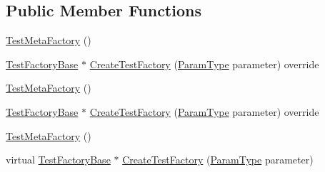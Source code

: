 \subsection*{Public Member Functions}
\begin{DoxyCompactItemize}
\item 
\mbox{\hyperlink{classtesting_1_1internal_1_1_test_meta_factory_a1a48d63fbff650741c8f718af5c373d2}{Test\+Meta\+Factory}} ()
\item 
\mbox{\hyperlink{classtesting_1_1internal_1_1_test_factory_base}{Test\+Factory\+Base}} $\ast$ \mbox{\hyperlink{classtesting_1_1internal_1_1_test_meta_factory_abd5d30fab71229deb5e63f5bb5ea3fd8}{Create\+Test\+Factory}} (\mbox{\hyperlink{classtesting_1_1internal_1_1_test_meta_factory_a392ebab15dfdcfa1b54bbe15878aa9cd}{Param\+Type}} parameter) override
\item 
\mbox{\hyperlink{classtesting_1_1internal_1_1_test_meta_factory_a1a48d63fbff650741c8f718af5c373d2}{Test\+Meta\+Factory}} ()
\item 
\mbox{\hyperlink{classtesting_1_1internal_1_1_test_factory_base}{Test\+Factory\+Base}} $\ast$ \mbox{\hyperlink{classtesting_1_1internal_1_1_test_meta_factory_abd5d30fab71229deb5e63f5bb5ea3fd8}{Create\+Test\+Factory}} (\mbox{\hyperlink{classtesting_1_1internal_1_1_test_meta_factory_a392ebab15dfdcfa1b54bbe15878aa9cd}{Param\+Type}} parameter) override
\item 
\mbox{\hyperlink{classtesting_1_1internal_1_1_test_meta_factory_a1a48d63fbff650741c8f718af5c373d2}{Test\+Meta\+Factory}} ()
\item 
virtual \mbox{\hyperlink{classtesting_1_1internal_1_1_test_factory_base}{Test\+Factory\+Base}} $\ast$ \mbox{\hyperlink{classtesting_1_1internal_1_1_test_meta_factory_a32c5cd65dfc718151de0b324ce713ee8}{Create\+Test\+Factory}} (\mbox{\hyperlink{classtesting_1_1internal_1_1_test_meta_factory_a392ebab15dfdcfa1b54bbe15878aa9cd}{Param\+Type}} parameter)
\end{DoxyCompactItemize}
